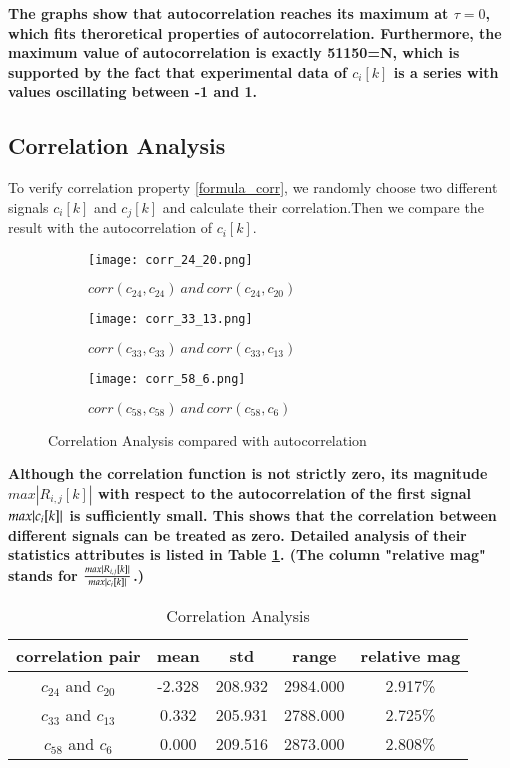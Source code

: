 \documentclass{article}
\begin{document}
\textbf{The graphs show that autocorrelation reaches its maximum at $\tau=0$, which fits theroretical properties of autocorrelation.
Furthermore, the maximum value of autocorrelation is exactly 51150=N, which is supported by the fact that experimental data of 
$c_i[k]$ is a series with values oscillating between -1 and 1.}


\subsection{Correlation Analysis}
\par To verify correlation property \ref{formula_corr}, we randomly choose two different signals  $c_{i}[k]$ and $c_{j}[k]$
and calculate their correlation.Then we compare the result with the autocorrelation of $c_i[k]$.
\begin{figure}[H]
    \centering
    \begin{subfigure}[b]{\textwidth}
        \centering
        \texttt{[image: corr\_24\_20.png]}
        \caption{$corr(c_{24},c_{24})\ and\ corr(c_{24}, c_{20})$}
    \end{subfigure}
    \hfill
    \begin{subfigure}[b]{\textwidth}
        \centering
        \texttt{[image: corr\_33\_13.png]}
        \caption{$corr(c_{33},c_{33})\ and\ corr(c_{33}, c_{13})$}
    \end{subfigure}
    \begin{subfigure}[b]{\textwidth}
        \centering
        \texttt{[image: corr\_58\_6.png]}
        \caption{$corr(c_{58},c_{58})\ and\ corr(c_{58}, c_{6})$}
    \end{subfigure}
    \caption{Correlation Analysis compared with autocorrelation}
    \label{fig_corr}
\end{figure}

\textbf{Although the correlation function is not strictly zero, its magnitude $max|R_{i,j}[k]|$ with respect to the autocorrelation of
the first signal $max\abs{c_{i}[k]}$  is sufficiently small. 
This shows that the correlation between different signals can be treated as zero.
Detailed analysis of their statistics attributes is listed in Table \ref{tab_corr}. (The column "relative mag" 
stands for $\frac{max|R_{i,j}[k]|}{max\abs{c_{i}[k]}}$.)}

\begin{table}[H]
    \centering
    \caption{Correlation Analysis}
    \begin{tabular}{c||c c c c}
        correlation pair & mean & std &range &relative mag\\
        \hline
        $c_{24}$ and $c_{20}$ & -2.328 &208.932 & 2984.000 & 2.917\%\\
        $c_{33}$ and $c_{13}$ & 0.332 &205.931  & 2788.000 & 2.725\%\\
        $c_{58}$ and $c_{6}$ & 0.000 &209.516  &2873.000 & 2.808\%\\
    \end{tabular}
    \label{tab_corr}
\end{table}
\end{document}

